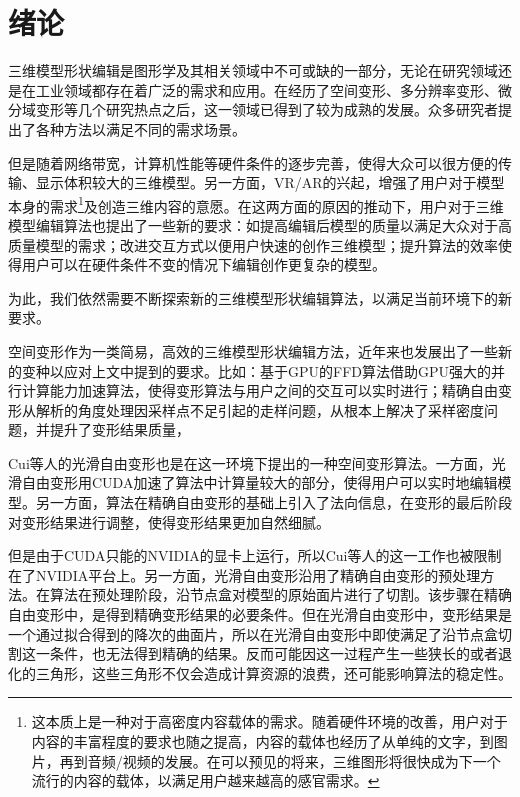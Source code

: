 
\chapter{绪论}

    三维模型形状编辑是图形学及其相关领域中不可或缺的一部分，无论在研究领域还是在工业领域都存在着广泛的需求和应用。在经历了空间变形、多分辨率变形、微分域变形等几个研究热点之后，这一领域已得到了较为成熟的发展。众多研究者提出了各种方法以满足不同的需求场景。

    但是随着网络带宽，计算机性能等硬件条件的逐步完善，使得大众可以很方便的传输、显示体积较大的三维模型。另一方面，VR/AR的兴起，增强了用户对于模型本身的需求\footnote{这本质上是一种对于高密度内容载体的需求。随着硬件环境的改善，用户对于内容的丰富程度的要求也随之提高，内容的载体也经历了从单纯的文字，到图片，再到音频/视频的发展。在可以预见的将来，三维图形将很快成为下一个流行的内容的载体，以满足用户越来越高的感官需求。}及创造三维内容的意愿。在这两方面的原因的推动下，用户对于三维模型编辑算法也提出了一些新的要求：如提高编辑后模型的质量以满足大众对于高质量模型的需求；改进交互方式以便用户快速的创作三维模型；提升算法的效率使得用户可以在硬件条件不变的情况下编辑创作更复杂的模型。

    为此，我们依然需要不断探索新的三维模型形状编辑算法，以满足当前环境下的新要求。

    空间变形作为一类简易，高效的三维模型形状编辑方法，近年来也发展出了一些新的变种以应对上文中提到的要求。比如：基于GPU的FFD算法借助GPU强大的并行计算能力加速算法，使得变形算法与用户之间的交互可以实时进行\cite{chua2000, modat2010}；精确自由变形\cite{Feng98, Feng00}从解析的角度处理因采样点不足引起的走样问题，从根本上解决了采样密度问题，并提升了变形结果质量，

    Cui等人的光滑自由变形\cite{Cui15}也是在这一环境下提出的一种空间变形算法。一方面，光滑自由变形用CUDA加速了算法中计算量较大的部分，使得用户可以实时地编辑模型。另一方面，算法在精确自由变形\cite{Feng98}的基础上引入了法向信息，在变形的最后阶段对变形结果进行调整，使得变形结果更加自然细腻。

    但是由于CUDA只能的NVIDIA的显卡上运行，所以Cui等人的这一工作也被限制在了NVIDIA平台上。另一方面，光滑自由变形沿用了精确自由变形\cite{Feng98, Feng00}的预处理方法。在算法在预处理阶段，沿节点盒对模型的原始面片进行了切割。该步骤在精确自由变形中，是得到精确变形结果的必要条件。但在光滑自由变形中，变形结果是一个通过拟合得到的降次的曲面片，所以在光滑自由变形中即使满足了沿节点盒切割这一条件，也无法得到精确的结果。反而可能因这一过程产生一些狭长的或者退化的三角形，这些三角形不仅会造成计算资源的浪费，还可能影响算法的稳定性。

